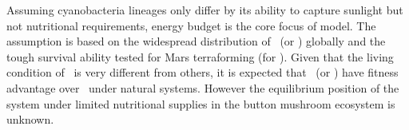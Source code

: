 \documentclass[../thesis.tex]{subfiles} %
\begin{document}
  Assuming cyanobacteria lineages only differ by its ability to capture sunlight but not nutritional requirements,\autocite{giraldo2014plant} energy budget is the core focus of model.  The assumption is based on the widespread distribution of \As\ (or \Ss) globally\autocite{joshi2018bacterial,sawa2017electricity} and the tough survival ability tested for Mars terraforming (for \Cs\autocite{baque2013boss}).  Given that the living condition of \Ct\ is very different from others,\autocite{nurnberg2018photochemistry} it is expected that \As\ (or \Ss) have fitness advantage over \Cs\ under natural systems.  However the equilibrium position of the system under limited nutritional supplies in the button mushroom ecosystem\autocite{joshi2018bacterial} is unknown.
\end{document}
